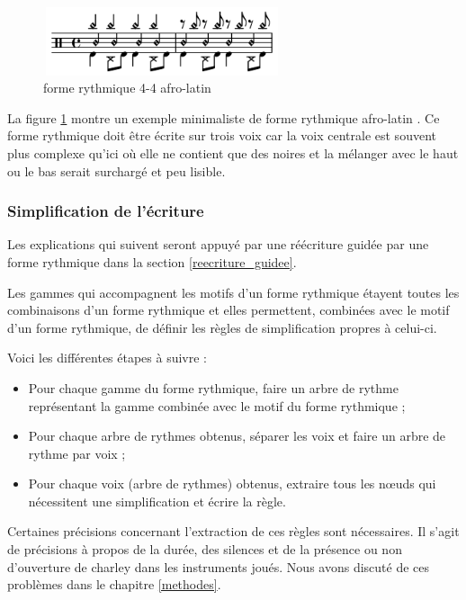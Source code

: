 \begin{figure}[h]
	\centering
	\includegraphics[height=20mm, width=70mm]{z_images/3_methodes/2_systemes/3_separation_afro-latins.png}
	\caption{forme rythmique 4-4 afro-latin}
	\label{afro_latin}
\end{figure}

La figure \ref{afro_latin} montre un exemple minimaliste de forme rythmique afro-latin \cite{system_drums}. 
Ce forme rythmique doit être écrite sur trois voix car la voix centrale est
souvent plus complexe qu’ici où elle ne contient que des noires et la mélanger
avec le haut ou le bas serait surchargé et peu lisible.

\subsubsection{Simplification de l’écriture}
Les explications qui suivent seront appuyé par une réécriture guidée par une
forme rythmique dans la section \ref{reecriture_guidee}.

Les gammes qui accompagnent les motifs d’un forme rythmique étayent toutes les combinaisons d’un forme rythmique et elles permettent, combinées avec le motif d’un forme rythmique, de définir les règles de simplification propres à celui-ci.

Voici les différentes étapes à suivre :
\begin{itemize}
	\item Pour chaque gamme du forme rythmique, faire un arbre de rythme représentant la gamme combinée avec le motif du forme rythmique ;
	\item Pour chaque arbre de rythmes obtenus, séparer les voix et faire un arbre de rythme par voix ;
	\item Pour chaque voix (arbre de rythmes) obtenus, extraire tous les nœuds qui nécessitent une simplification et écrire la règle.
\end{itemize}

Certaines précisions concernant l’extraction de ces règles sont nécessaires. 
Il s’agit de précisions à propos de la durée, des silences et de la présence ou non d’ouverture de charley dans les instruments joués. 
Nous avons discuté de ces problèmes dans le chapitre \ref{methodes}.

